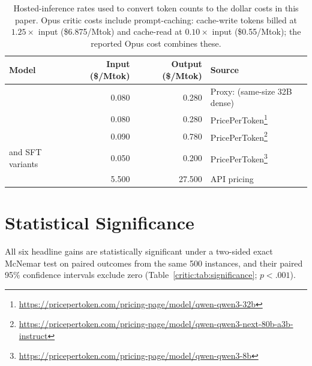\begin{table}[t]
\centering
\small
\setlength{\tabcolsep}{4pt}
\begin{tabular}{@{}l r r l@{}}
\toprule
\textbf{Model} & \textbf{Input (\$/Mtok)} & \textbf{Output (\$/Mtok)} & \textbf{Source} \\
\midrule
\criticcwm{}                              & 0.080 & 0.280 & Proxy: \criticqwenThirtyTwoB{} (same-size 32B dense) \\
\criticqwenThirtyTwoB{}                   & 0.080 & 0.280 & PricePerToken\footnote{\url{https://pricepertoken.com/pricing-page/model/qwen-qwen3-32b}} \\
\criticqwenNextEightyB{}                  & 0.090 & 0.780 & PricePerToken\footnote{\url{https://pricepertoken.com/pricing-page/model/qwen-qwen3-next-80b-a3b-instruct}} \\
\criticqwenEightB{} and SFT variants      & 0.050 & 0.200 & PricePerToken\footnote{\url{https://pricepertoken.com/pricing-page/model/qwen-qwen3-8b}} \\
\criticopus{}                             & 5.500 & 27.500 & API pricing \\
\bottomrule
\end{tabular}
\caption{Hosted-inference rates used to convert token counts to the dollar costs in this paper. Opus critic costs include prompt-caching: cache-write tokens billed at $1.25\times$ input (\$6.875/Mtok) and cache-read at $0.10\times$ input (\$0.55/Mtok); the reported Opus cost combines these.}
\label{critic:tab:pricing}
\end{table}

\section{Statistical Significance}
\label{critic:app:significance}

All six headline gains are statistically significant under a two-sided exact McNemar test on paired outcomes from the same 500 instances, and their paired 95\% confidence intervals exclude zero (Table~\ref{critic:tab:significance}; $p<.001$).

